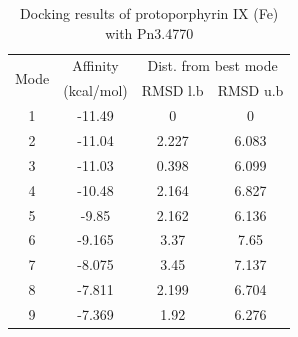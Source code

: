 \documentclass[12pt]{article}
\begin{document}
	
	
	\begin{table}[h!]
		\centering
		\caption{\centering Docking results of protoporphyrin IX (Fe) with Pn3.4770}
		\label{table5k_1}
		\begin{tabular}{cccc}
			\toprule
			\multirow{2}{*}{Mode} & Affinity & \multicolumn{2}{c}{Dist. from best mode}\\
			&  (kcal/mol) & RMSD l.b & RMSD u.b\\
			\midrule
			1 & -11.49   &       0   &       0\\
			2 & -11.04   &   2.227   &   6.083\\
			3 & -11.03   &   0.398   &   6.099\\
			4 & -10.48   &   2.164   &   6.827\\
			5 &  -9.85   &   2.162   &   6.136\\
			6 & -9.165   &    3.37   &    7.65\\
			7 & -8.075   &    3.45   &   7.137\\
			8 & -7.811   &   2.199   &   6.704\\
			9 & -7.369   &    1.92   &   6.276\\
			\bottomrule
			
		\end{tabular}
	\end{table}
	
\end{document}
